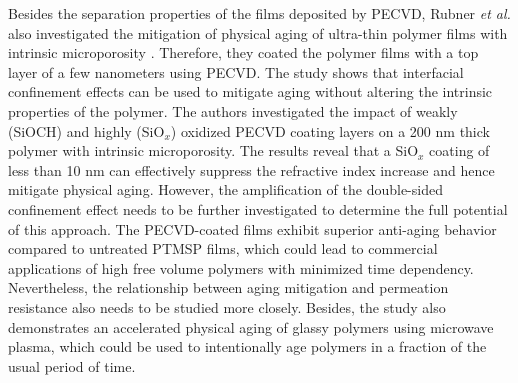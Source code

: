 \documentclass[AMA,STIX2COL]{WileyNJD-v2} %
\begin{document}
Besides the separation properties of the films deposited by PECVD, Rubner \textit{et al.} also investigated the mitigation of physical aging of ultra-thin polymer films with intrinsic microporosity \cite{rubner2022organosilica}. Therefore, they coated the polymer films with a top layer of a few nanometers using PECVD. The study shows that interfacial confinement effects can be used to mitigate aging without altering the intrinsic properties of the polymer. The authors investigated the impact of weakly (SiOCH) and highly (SiO$_x$) oxidized PECVD coating layers on a 200 nm thick polymer with intrinsic microporosity. The results reveal that a SiO$_x$ coating of less than 10 nm can effectively suppress the refractive index increase and hence mitigate physical aging. However, the amplification of the double-sided confinement effect needs to be further investigated to determine the full potential of this approach. The PECVD-coated films exhibit superior anti-aging behavior compared to untreated PTMSP films, which could lead to commercial applications of high free volume polymers with minimized time dependency. Nevertheless, the relationship between aging mitigation and permeation resistance also needs to be studied more closely. Besides, the study also demonstrates an accelerated physical aging of glassy polymers using microwave plasma, which could be used to intentionally age polymers in a fraction of the usual period of time. \\
\end{document}
